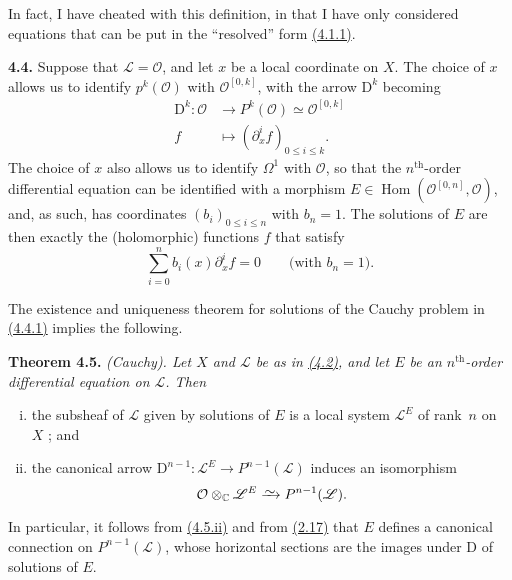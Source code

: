\documentclass{report}
\newenvironment{itenv}[1]
  {\phantomsection\par\medskip\noindent\textbf{#1.}\itshape}
  {\par\medskip}
\newenvironment{rmenv}[1]
  {\phantomsection\par\medskip\noindent\textbf{#1.}\rmfamily}
  {\par\medskip}
\newcommand{\scr}[1]{{\mathscr{#1}}}
\renewcommand{\cal}[1]{{\mathcal{#1}}}
\newcommand{\CC}{\mathbb{C}}
\newcommand{\DD}{\mathrm{D}}
\newcommand{\simto}{\xrightarrow{\raisebox{-0.7ex}[0ex][0ex]{$\sim$}}}
\renewcommand{\leq}{\leqslant}
\DeclareMathOperator{\Hom}{Hom}
\newcommand{\oldpage}[1]{\marginpar{\footnotesize$\Big\vert$ \textit{p.~#1}}}
\begin{document}
In fact, I have cheated with this definition, in that I have only considered equations that can be put in the ``resolved'' form \hyperref[I.4.1.1]{(4.1.1)}.

\oldpage{25}
\begin{rmenv}{4.4}
\label{I.4.4}
  Suppose that $\scr{L}=\cal{O}$, and let $x$ be a local coordinate on $X$.
  The choice of $x$ allows us to identify $p^k(\cal{O})$ with $\cal{O}^{[0,k]}$, with the arrow $\DD^k$ becoming
  \[
    \begin{aligned}
      \DD^k\colon \cal{O} &\to P^k(\cal{O}) \simeq \cal{O}^{[0,k]}
    \\f &\mapsto (\partial_x^i f)_{0\leq i\leq k}.
    \end{aligned}
  \]
  The choice of $x$ also allows us to identify $\Omega^1$ with $\cal{O}$, so that the $n^\mathrm{th}$-order differential equation can be identified with a morphism $E\in\Hom(\cal{O}^{[0,n]},\cal{O})$, and, as such, has coordinates $(b_i)_{0\leq i\leq n}$ with $b_n=1$.
  The solutions of $E$ are then exactly the (holomorphic) functions $f$ that satisfy
  \[
  \label{I.4.4.1}
    \sum_{i=0}^n b_i(x) \partial_x^i f = 0
    \qquad\mbox{(with $b_n=1$).}
  \tag{4.4.1}
  \]

  The existence and uniqueness theorem for solutions of the Cauchy problem in \hyperref[I.4.4.1]{(4.4.1)} implies the following.
\end{rmenv}

\begin{itenv}{Theorem 4.5}
\label{I.4.5}
  \emph{(Cauchy).}
  Let $X$ and $\scr{L}$ be as in \hyperref[I.4.2]{(4.2)}, and let $E$ be an $n^\mathrm{th}$-order differential equation on $\scr{L}$.
  Then
  \begin{enumerate}[(i)]
    \item the subsheaf of $\scr{L}$ given by solutions of $E$ is a local system $\scr{L}^E$ of rank~$n$ on $X$ ; and
    \item the canonical arrow $\DD^{n-1}\colon\scr{L}^E \to P^{n-1}(\scr{L})$ induces an isomorphism
      \[
        \cal{O}\otimes_\CC\scr{L}^E \simto P^{n-1}(\scr{L}).
      \]
  \end{enumerate}
\end{itenv}

In particular, it follows from \hyperref[I.4.5]{(4.5.ii)} and from \hyperref[I.2.17]{(2.17)} that $E$ defines a canonical connection on $P^{n-1}(\scr{L})$, whose horizontal sections are the images under $\DD$ of solutions of $E$.
\end{document}
